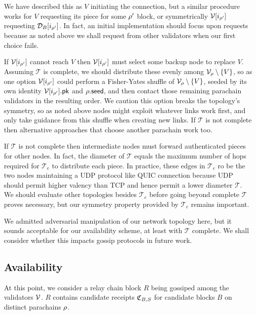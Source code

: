 We have described this as $V$ initiating the connection, but a similar procedure works for $V$ requesting its piece for some $\rho'$ block, or symmetrically $\mathcal{V}[i_{\rho'}]$ requesting $\mathcal{D}_B[i_{\rho'}]$.  In fact, an initial implementation should focus upon requests because as noted above we shall request from other validators when our first choice fails. 

If $\mathcal{V}[i_{\rho'}]$ cannot reach $V$ then $\mathcal{V}[i_{\rho'}]$ must select some backup node to replace $V$.  Assuming $\mathcal{T}$ is complete, we should distribute these evenly among $\mathcal{V}_{\rho} \setminus \{V\}$, so as one option $\mathcal{V}[i_{\rho'}]$ could perform a Fisher-Yates shuffle of $\mathcal{V}_{\rho} \setminus \{V\}$, seeded by its own identity $\mathcal{V}[i_{\rho'}].\mathsf{pk}$ and $\rho.\mathsf{seed}$, and then contact those remaining parachain validators in the resulting order.  We caution this option breaks the topology's symmetry, so as noted above nodes might exploit whatever links work first, and only take guidance from this shuffle when creating new links.  If $\mathcal{T}$ is not complete then alternative approaches that choose another parachain work too.  

If $\mathcal{T}$ is not complete then intermediate nodes must forward authenticated pieces for other nodes.  In fact, the diameter of $\mathcal{T}$ equals the maximum number of hops required for $\mathcal{T}_e$ to distribute each piece.  
In practice, these edges in $\mathcal{T}_e$ ro be the two nodes
maintaining a UDP protocol like QUIC connection because UDP should permit higher valency than TCP and hence permit a lower diameter $\mathcal{T}$.  
We should evaluate other topologies besides $\mathcal{T}_e$ before going beyond complete $\mathcal{T}$ proves necessary, but our symmetry property provided by $\mathcal{T}_e$ remains important. 

We admitted adversarial manipulation of our network topology here, but it sounds acceptable for our availability scheme, at least with $\mathcal{T}$ complete.  We shall consider whether this impacts gossip protocols in future work. 


\subsection{Availability}
\label{sec:availability}  %

At this point, we consider a relay chain block $R$ being gossiped among the validators $\mathcal{V}$.  $R$ contains candidate receipts $\mathfrak{C}_{B,S}$ for candidate blocks $B$ on distinct parachains $\rho$.  

